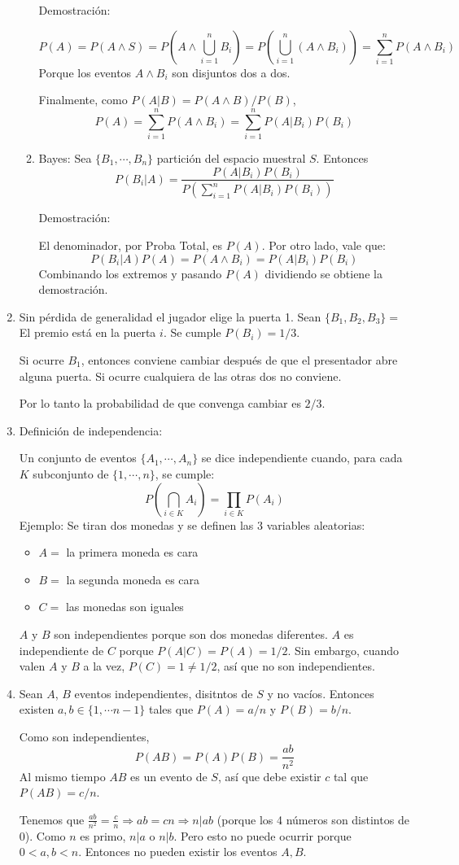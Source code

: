 \begin{enumerate}
\begin{enumerate}
			Demostración:
			
			$$P(A) = P(A \land S) = P\left(A \land \bigcup_{i=1}^{n}B_i\right) = P(\bigcup_{i=1}^{n}(A \land B_i)) = \sum_{i=1}^n P(A\land B_i)$$
			Porque los eventos $A\land B_i$ son disjuntos dos a dos.
			
			Finalmente, como $P(A|B) = P(A\land B)/P(B)$,
			$$P(A) = \sum_{i=1}^n P(A\land B_i) = \sum_{i=1}^n P(A|B_i)P(B_i)$$
		\item Bayes:
			Sea $\{B_1, \cdots, B_n\}$ partición del espacio muestral $S$. Entonces
				$$P(B_i|A) = \frac{P(A|B_i)P(B_i)}{P\left(\sum_{i=1}^{n} P(A|B_i)P(B_i)\right)}$$
				
			Demostración:
			
			El denominador, por Proba Total, es $P(A)$. Por otro lado, vale que:
			$$P(B_i|A)P(A) = P(A\land B_i) = P(A|B_i)P(B_i)$$
			Combinando los extremos y pasando $P(A)$ dividiendo se obtiene la demostración.
		\end{enumerate}
	\item
		Sin pérdida de generalidad el jugador elige la puerta 1. Sean $\{B_1, B_2, B_3\} = $ El premio está en la puerta $i$. Se cumple $P(B_i) = 1/3$.
		
		Si ocurre $B_1$, entonces conviene cambiar después de que el presentador abre alguna puerta. Si ocurre cualquiera de las otras dos no conviene.
		
		Por lo tanto la probabilidad de que convenga cambiar es $2/3$.
	\item
		Definición de independencia:
			
			Un conjunto de eventos $\{A_1, \cdots, A_n\}$ se dice independiente cuando, para cada $K$ subconjunto de $\{1, \cdots, n\}$, se cumple:
			$$P\left(\bigcap_{i\in K}{A_i}\right) = \prod_{i\in K}P(A_i)$$
		Ejemplo: Se tiran dos monedas y se definen las 3 variables aleatorias:
		\begin{itemize}
			\item $A = $ la primera moneda es cara
			\item $B = $ la segunda moneda es cara
			\item $C = $ las monedas son iguales
		\end{itemize}
		$A$ y $B$ son independientes porque son dos monedas diferentes. $A$ es independiente de $C$ porque $P(A|C) = P(A) = 1/2$. Sin embargo, cuando valen $A$ y $B$ a la vez, $P(C) = 1 \neq 1/2$, así que no son independientes.
	\item
		Sean $A$, $B$ eventos independientes, disitntos de $S$ y no vacíos. Entonces existen $a,b \in \{1, \cdots n-1\}$ tales que $P(A) = a/n$ y $P(B) = b/n$.
		
		Como son independientes, $$P(AB) = P(A)P(B) = \frac{ab}{n^2}$$
		Al mismo tiempo $AB$ es un evento de $S$, así que debe existir $c$ tal que $P(AB) = c/n$.
		
		Tenemos que $\frac{ab}{n^2} = \frac{c}{n}\Rightarrow ab=cn \Rightarrow n|ab$ (porque los 4 números son distintos de $0$).
		Como $n$ es primo, $n|a$ o $n|b$. Pero esto no puede ocurrir porque $0<a,b<n$. Entonces no pueden existir los eventos $A,B$. 
\end{enumerate}
